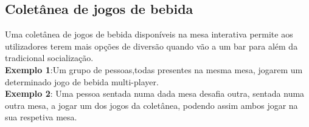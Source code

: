 \documentclass{article}
\begin{document}
\subsection*{Coletânea de jogos de bebida}
Uma coletânea de jogos de bebida disponíveis na mesa interativa permite aos utilizadores terem mais opções de diversão quando vão a um bar para além da tradicional socialização.\\
\textbf{Exemplo 1}:Um grupo de pessoas,todas presentes na mesma mesa, jogarem um determinado jogo de bebida multi-player.\\
\textbf{Exemplo 2}: Uma pessoa sentada numa dada mesa desafia outra, sentada numa outra mesa, a jogar um dos jogos da coletânea, podendo assim ambos jogar na sua respetiva mesa.
\end{document}
